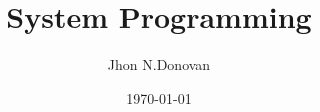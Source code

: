 \documentclass{article}
\begin{document}
\title{System Programming}
\author{Jhon N.Donovan}
\date{\today}
\maketitle
\end{document}
